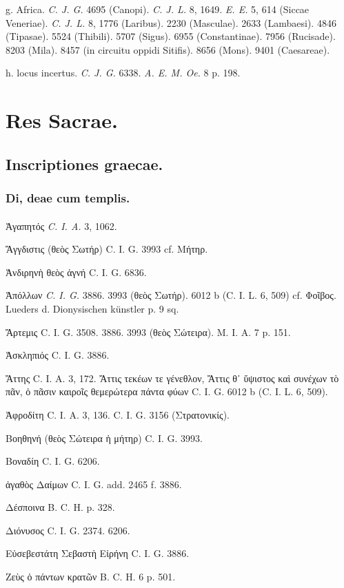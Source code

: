 \documentclass[a4paper, 11pt, oneside, polutonikogreek, german]{article}
\begin{document}
g. Africa. \emph{C. J. G.} 4695 (Canopi). \emph{C. J. L.} 8, 1649. \emph{E. E.} 5, 614 (Siccae Veneriae). \emph{C. J. L.} 8, 1776 (Laribus). 2230 (Masculae). 2633 (Lambaesi). 4846 (Tipasae). 5524 (Thibili). 5707 (Sigus). 6955 (Constantinae). 7956 (Rucisade). 8203 (Mila). 8457 (in circuitu oppidi Sitifis). 8656 (Mons). 9401 (Caesareae).

h. locus incertus. \emph{C. J. G.} 6338. \emph{A. E. M. Oe.} 8 p. 198.
\clearpage
\section{Res Sacrae.}
\subsection{Inscriptiones graecae.}
\subsubsection{Di, deae cum templis.}
\paragraph{}
Ἀγαπητός \emph{C. I. A.} 3, 1062.

Ἄγγδιστις (θεὸς Σωτήρ) C. I. G. 3993 cf. Μήτηρ.

Ἀνδιρηνὴ θεὸς ἁγνή C. I. G. 6836.

Ἀπόλλων \emph{C. I. G.} 3886. 3993 (θεὸς Σωτήρ). 6012 b (C. I. L. 6, 509) cf. Φοῖβος. Lueders d. Dionysischen künstler p. 9 sq.

Ἄρτεμις C. I. G. 3508. 3886. 3993 (θεὸς Σώτειρα). M. I. A. 7 p. 151.

Ἀσκληπιός C. I. G. 3886.

Ἄττης C. I. A. 3, 172. Ἄττις τεκέων τε γένεθλον, Ἄττις θ᾽ ὕψιστος καὶ συνέχων τὸ πᾶν, ὁ πᾶσιν καιροῖς θεμερώτερα πάντα φύων C. I. G. 6012 b (C. I. L. 6, 509).

Ἀφροδίτη C. I. A. 3, 136. C. I. G. 3156 (Στρατονικίς).

Βοηθηνή (θεὸς Σώτειρα ἡ μήτηρ) C. I. G. 3993.

Βοναδίη C. I. G. 6206.

ἀγαθὸς Δαίμων C. I. G. add. 2465 f. 3886.

Δέσποινα B. C. H. p. 328.

Διόνυσος C. I. G. 2374. 6206.

Εὐσεβεστάτη Σεβαστὴ Εἰρήνη C. I. G. 3886.

Ζεὺς ὁ πάντων κρατῶν B. C. H. 6 p. 501.
\end{document}
